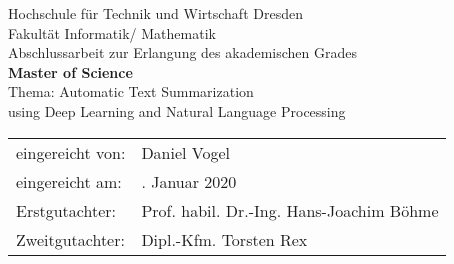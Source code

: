 \begin{titlepage}

\begin{center}
\large{Hochschule für Technik und Wirtschaft Dresden} \\[1ex]
\large{Fakultät Informatik/ Mathematik} \\[18ex]
\Large{Abschlussarbeit zur Erlangung des akademischen Grades} \\[3ex]
\LARGE{\textbf{Master of Science}} \\[12ex]
\Large{Thema: Automatic Text Summarization} \\[1ex]
\Large{using Deep Learning and Natural Language Processing} \\[18ex]
\end{center}

\begin{flushleft}
\begin{tabular}{ll}
eingereicht von: & \quad Daniel Vogel \\[2ex]
eingereicht am: & \quad 1. Januar 2020 \\[2ex]
Erstgutachter:  & \quad Prof. habil. Dr.-Ing. Hans-Joachim Böhme \\[2ex]
Zweitgutachter: & \quad Dipl.-Kfm. Torsten Rex \\[2ex]
\end{tabular}
\end{flushleft}

\end{titlepage}
